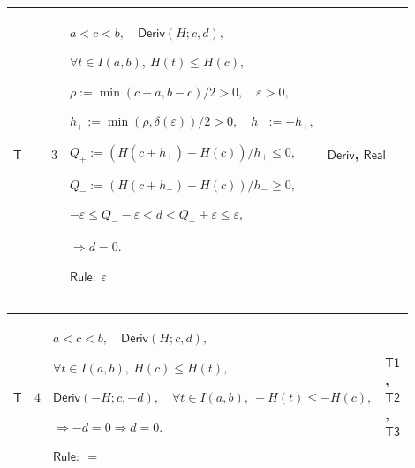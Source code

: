 \documentclass[12pt,reqno]{amsart}
\theoremstyle{blueplain}
\numberwithin{equation}{section}
\begin{document}
{\scriptsize \setlength{\parskip}{0pt}\nointerlineskip
\noindent 
\begin{tabular}{|@{}>{\centering\arraybackslash}m{0.10658\linewidth}|>{\centering\arraybackslash}m{0.03553\linewidth}|>{\centering\arraybackslash}m{0.52105\linewidth}|>{\centering\arraybackslash}m{0.23684\linewidth}|}
\hline
\hypertarget{proof:T3}{$\displaystyle \mathsf{T}$} & $\displaystyle 3$ & $%
\displaystyle a<c<b,\quad\mathsf{Deriv}(H;c,d),$\par$\displaystyle \forall
t\in I(a,b),\ H(t)\le H(c),$\par$\displaystyle \rho:=\min(c-a,b-c)/2>0,\quad%
\varepsilon>0,$\par$\displaystyle h_+:=\min(\rho,\delta(\varepsilon))/2>0,%
\quad h_-:=-h_+,$\par$\displaystyle Q_+:=(H(c+h_+)-H(c))/h_+\le0,$\par$%
\displaystyle Q_-:=(H(c+h_-)-H(c))/h_-\ge0,$\par$\displaystyle %
-\varepsilon\le Q_--\varepsilon<d<Q_++\varepsilon\le\varepsilon,$\par$%
\displaystyle \Rightarrow d=0.$\par$\displaystyle \mathsf{Rule}:\
\varepsilon $ & \hyperlink{def:Deriv}{$\displaystyle \mathsf{Deriv}$}, 
\hyperlink{ax:Real}{$\displaystyle \mathsf{Real}$} \\ \hline
\end{tabular}%
}

{\scriptsize \setlength{\parskip}{0pt}\nointerlineskip
\noindent 
\begin{tabular}{|@{}>{\centering\arraybackslash}m{0.10658\linewidth}|>{\centering\arraybackslash}m{0.03553\linewidth}|>{\centering\arraybackslash}m{0.52105\linewidth}|>{\centering\arraybackslash}m{0.23684\linewidth}|}
\hline
\hypertarget{proof:T4}{$\displaystyle \mathsf{T}$} & $\displaystyle 4$ & $%
\displaystyle a<c<b,\quad\mathsf{Deriv}(H;c,d),$\par$\displaystyle \forall
t\in I(a,b),\ H(c)\le H(t),$\par$\displaystyle \mathsf{Deriv}%
(-H;c,-d),\quad\forall t\in I(a,b),\ -H(t)\le-H(c),$\par$\displaystyle %
\Rightarrow-d=0\Rightarrow d=0.$\par$\displaystyle \mathsf{Rule}:\ =$ & 
\hyperlink{proof:T1}{$\displaystyle \mathsf{T1}$}, \hyperlink{proof:T2}{$%
\displaystyle \mathsf{T2}$}, \hyperlink{proof:T3}{$\displaystyle \mathsf{T3}$%
} \\ \hline
\end{tabular}%
}
\end{document}
